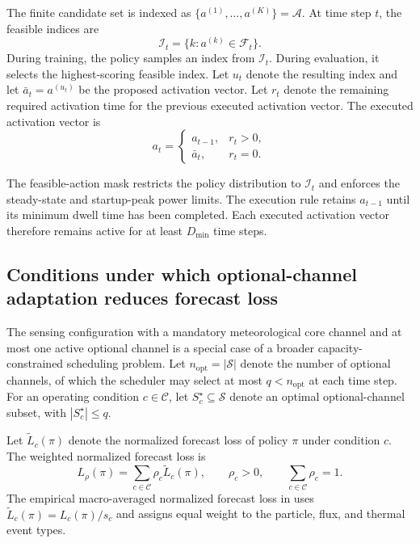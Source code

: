 The finite candidate set is indexed as
$\{a^{(1)},\ldots,a^{(K)}\}=\mathcal{A}$. At time step $t$, the feasible
indices are
\[
  \mathcal{I}_t=\{k:a^{(k)}\in\mathcal{F}_t\}.
\]
During training, the policy samples an index from $\mathcal{I}_t$. During
evaluation, it selects the highest-scoring feasible index. Let $u_t$ denote the
resulting index and let $\bar a_t=a^{(u_t)}$ be the proposed activation vector.
Let $r_t$ denote the remaining required activation time for the previous
executed activation vector. The executed activation vector is
\begin{equation}
  a_t=
  \begin{cases}
    a_{t-1}, & r_t>0,\\
    \bar a_t, & r_t=0.
  \end{cases}
  \label{eq:minimum_activation_rule}
\end{equation}

The feasible-action mask restricts the policy distribution to
$\mathcal{I}_t$ and enforces the steady-state and startup-peak power limits. The
execution rule retains $a_{t-1}$ until its minimum dwell time has been
completed. Each executed activation vector therefore remains active for at least
$D_{\min}$ time steps.

\subsection{Conditions under which optional-channel adaptation reduces forecast loss}

The sensing configuration with a mandatory meteorological core channel and at most one
active optional channel is a special case of a broader capacity-constrained
scheduling problem. Let $n_{\mathrm{opt}}=|\mathcal{S}|$ denote the number of
optional channels, of which the scheduler may select at most
$q<n_{\mathrm{opt}}$ at each time step. For an operating
condition $c\in\mathcal{C}$, let
$S_c^\star\subseteq\mathcal{S}$ denote an optimal optional-channel subset, with
$|S_c^\star|\leq q$.

Let $\widetilde L_c(\pi)$ denote the normalized forecast loss of policy $\pi$
under condition $c$. The weighted normalized forecast loss is
\[
L_{\rho}(\pi)
=
\sum_{c\in\mathcal{C}}
\rho_c\widetilde L_c(\pi),
\qquad
\rho_c>0,
\qquad
\sum_{c\in\mathcal{C}}\rho_c=1.
\]
The empirical macro-averaged normalized forecast loss in
 uses
$\widetilde L_c(\pi)=L_c(\pi)/s_c$ and assigns equal weight to the particle,
flux, and thermal event types.

